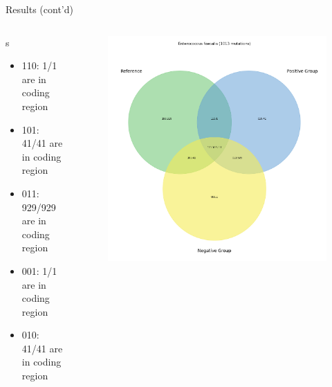 \documentclass{beamer}
\begin{document}
\begin{frame}{Results (cont'd)}
	\begin{columns}
		\footnotesize{
			\begin{column}{.58\textwidth}
				s\textunderscore\@\textunderscore\@Enterococcus\textunderscore\@faecalis
				\begin{itemize}
					\item 110: 1/1 are in coding region
					\item 101: 41/41 are in coding region
					\item 011: 929/929 are in coding region
					\item 001: 1/1 are in coding region
					\item 010: 41/41 are in coding region
				\end{itemize}
			\end{column}
		}
		\begin{column}{.48\textwidth}
			\begin{figure}[ht]
				\centering
				\includegraphics[width=1\textwidth]{img/Enterococcus-faecalis-venn.png}
				\caption*{\label{fig:Enterococcus-venn}}
			\end{figure}
		\end{column}
	\end{columns}
\end{frame}
\end{document}
